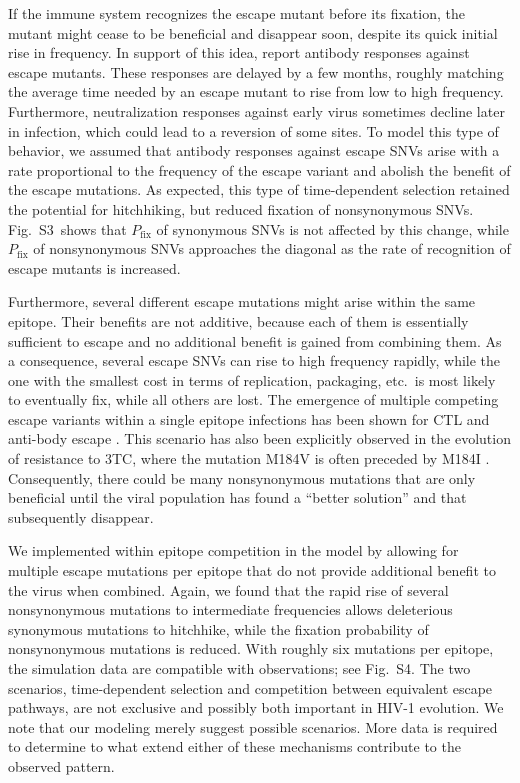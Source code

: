 \documentclass[11pt]{article}
\newcommand{\pfix}{P_{\mathrm{fix}}}
\newcommand{\timedependence}{3}
\newcommand{\withinepi}{4}
\begin{document}
If the immune system recognizes the escape mutant before its fixation,
the mutant might cease to be beneficial and disappear soon, despite its
quick initial rise in frequency. In support of this idea,
\citet{richman_rapid_2003,wei_antibody_2003,bunnik_autologous_2008}
report antibody responses against escape mutants. These
responses are delayed by a few months, roughly matching the average time
needed by an escape mutant to rise from low to high
frequency. Furthermore, neutralization responses against early virus
sometimes decline later in infection, which could lead to a reversion of
some sites. To model
this type of behavior, we assumed that antibody responses against escape
SNVs arise with a rate proportional to the frequency of the escape
variant and abolish the benefit of the escape mutations. As expected,
this type of time-dependent selection retained the potential for
hitchhiking, but reduced fixation of nonsynonymous SNVs.
Fig.~S\timedependence~shows that $\pfix$ of synonymous SNVs is
not affected by this change, while $\pfix$ of nonsynonymous SNVs
approaches the diagonal as the rate of recognition of escape mutants is
increased.

Furthermore, several different escape mutations might arise within the same epitope.
Their benefits are not additive, because each of
them is essentially sufficient to escape and no additional benefit is
gained from combining them. As a consequence, several escape SNVs can rise
to high frequency rapidly, while the one with the smallest cost in terms
of replication, packaging, etc.~is most likely to eventually fix, while
all others are lost. The emergence of multiple competing escape variants
within a single epitope infections has been shown for CTL and anti-body escape 
\citep{fischer_transmission_2010,moore_limited_2009, bar_early_2012,wei_antibody_2003}.  
This scenario has also been explicitly
observed in the evolution of resistance to 3TC, where the mutation M184V
is often preceded by M184I \citep{hedskog_dynamics_2010}. Consequently, there could be many
nonsynonymous mutations that are only beneficial until the viral population
has found a ``better solution'' and that subsequently disappear. 

We implemented within epitope
competition in the model by allowing for multiple escape mutations per
epitope that do not provide additional benefit to the virus when
combined. Again, we found that the rapid rise of several nonsynonymous
mutations to intermediate frequencies allows deleterious synonymous
mutations to hitchhike, while the fixation probability of nonsynonymous
mutations is reduced. With roughly six mutations per epitope,
the simulation data are compatible with observations; see
Fig.~S\withinepi. The two scenarios, time-dependent selection and
competition between equivalent escape pathways, are not exclusive and
possibly both important in HIV-1 evolution. We note that our modeling merely suggest
possible scenarios. More data is required to determine to what extend
either of these mechanisms contribute to the observed pattern.
\end{document}

